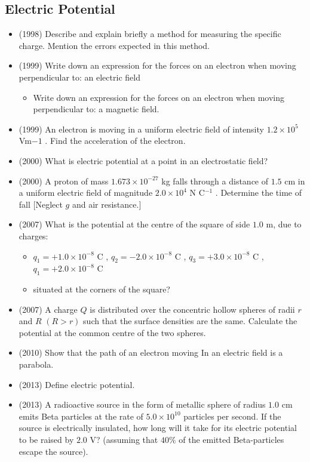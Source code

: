 \documentclass{article}
\begin{document}
\subsection{Electric Potential}
\begin{itemize}
\item (1998)  Describe and explain briefly a method for measuring the specific charge. Mention the errors expected in this method.
\item (1999)  Write down an expression for the forces on an electron when moving perpendicular to: an electric field
 \begin{itemize}
\item Write down an expression for the forces on an electron when moving perpendicular to: a magnetic field.
\end{itemize}
\item (1999)  An electron is moving in a uniform electric field of intensity $ 1.2 \times 10^5$ Vm​ $ -1$ .  Find the acceleration of the electron.
\item (2000)  What is electric potential at a point in an electrostatic field? 
\item (2000)  A proton of mass $ 1.673 \times 10^{-27}$ kg falls through a distance of $ 1.5$ cm in a uniform electric field of magnitude $ 2.0 \times 10^{4}$ N C$ ^{-1}$ . Determine the time of fall [Neglect $ g$ and air resistance.]
\item (2007)  What is the potential at the centre of the square of side $ 1.0$ m, due to charges:
 \begin{itemize}
\item $ q_{1}=+1.0\times10^{-8}$ C , $ q_{2}=-2.0\times10^{-8}$ C , $ q_{3}=+3.0\times10^{-8}$ C , $ q_{1}= +2.0\times10^{-8}$ C
\item situated at the corners of the square?
\end{itemize}
\item (2007)  A charge $ Q$ is distributed over the concentric hollow spheres of radii $ r$ and $ R$ $ (R>r)$ such that the surface densities are the same.  Calculate the potential at the common centre of the two spheres.
\item (2010)  Show that the path of an electron moving In an electric field is a parabola.
\item (2013)  Define electric potential.
\item (2013)  A radioactive source in the form of metallic sphere of radius $ 1.0$ cm emits Beta particles at the rate of $ 5.0 \times 10^{10}$ particles per second.  If the source is electrically insulated, how long will it take for its electric potential to be raised by $ 2.0$ V? (assuming that $ 40\%$ of the emitted Beta-particles escape the source).

\end{itemize}
\end{document}

